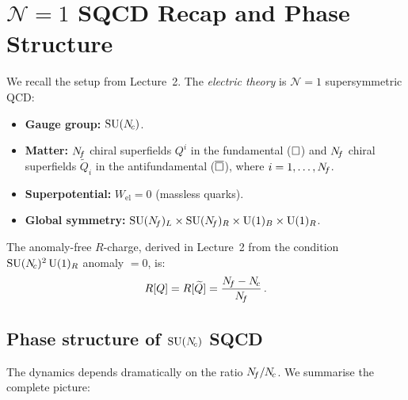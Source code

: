 \documentclass[11pt,a4paper]{article}
\begin{document}
\section{$\mathcal{N}=1$ SQCD Recap and Phase Structure}
\label{sec:recap}

We recall the setup from Lecture~2.  The \emph{electric theory} is
$\mathcal{N}=1$ supersymmetric QCD:
\begin{itemize}
  \item \textbf{Gauge group:} $\mathrm{SU}(N_{\!c})$.
  \item \textbf{Matter:} $N_{\!f}$ chiral superfields $Q^i$ in the fundamental
    ($\square$) and $N_{\!f}$ chiral superfields $\widetilde{Q}_i$ in the
    antifundamental ($\overline{\square}$), where $i = 1, \ldots, N_{\!f}$.
  \item \textbf{Superpotential:} $W_{\text{el}} = 0$ (massless quarks).
  \item \textbf{Global symmetry:}
    $\mathrm{SU}(N_{\!f})_L \times \mathrm{SU}(N_{\!f})_R \times \mathrm{U}(1)_B \times \mathrm{U}(1)_R$.
\end{itemize}

The anomaly-free $R$-charge, derived in Lecture~2 from the condition
$\mathrm{SU}(N_{\!c})^2 \,\mathrm{U}(1)_R$ anomaly $= 0$, is:
\begin{equation}\label{eq:Rcharge}
  R[Q] = R[\widetilde{Q}]
  = \frac{N_{\!f} - N_{\!c}}{N_{\!f}}\,.
\end{equation}

\subsection{Phase structure of $\mathrm{SU}(N_{\!c})$ SQCD}

The dynamics depends dramatically on the ratio $N_{\!f} / N_{\!c}$.  We summarise the
complete picture:
\end{document}
